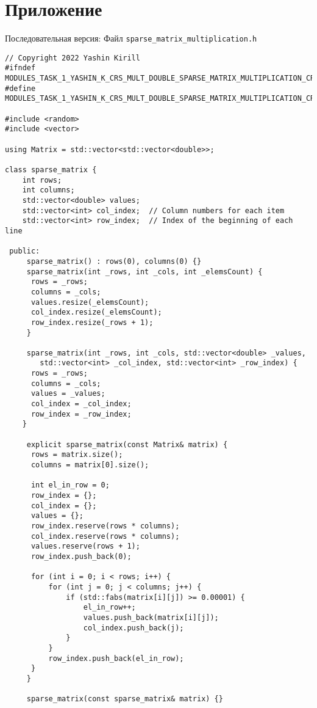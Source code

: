 \documentclass{report}
\begin{document}
\section*{Приложение}
Последовательная версия:
\newline
Файл \verb|sparse_matrix_multiplication.h|
\begin{lstlisting}
// Copyright 2022 Yashin Kirill
#ifndef MODULES_TASK_1_YASHIN_K_CRS_MULT_DOUBLE_SPARSE_MATRIX_MULTIPLICATION_CRS_H_
#define MODULES_TASK_1_YASHIN_K_CRS_MULT_DOUBLE_SPARSE_MATRIX_MULTIPLICATION_CRS_H_

#include <random>
#include <vector>

using Matrix = std::vector<std::vector<double>>;

class sparse_matrix {
    int rows;
    int columns;
    std::vector<double> values;
    std::vector<int> col_index;  // Column numbers for each item
    std::vector<int> row_index;  // Index of the beginning of each line

 public:
     sparse_matrix() : rows(0), columns(0) {}
     sparse_matrix(int _rows, int _cols, int _elemsCount) {
      rows = _rows;
      columns = _cols;
      values.resize(_elemsCount);
      col_index.resize(_elemsCount);
      row_index.resize(_rows + 1);
     }

     sparse_matrix(int _rows, int _cols, std::vector<double> _values,
        std::vector<int> _col_index, std::vector<int> _row_index) {
      rows = _rows;
      columns = _cols;
      values = _values;
      col_index = _col_index;
      row_index = _row_index;
    }

     explicit sparse_matrix(const Matrix& matrix) {
      rows = matrix.size();
      columns = matrix[0].size();

      int el_in_row = 0;
      row_index = {};
      col_index = {};
      values = {};
      row_index.reserve(rows * columns);
      col_index.reserve(rows * columns);
      values.reserve(rows + 1);
      row_index.push_back(0);

      for (int i = 0; i < rows; i++) {
          for (int j = 0; j < columns; j++) {
              if (std::fabs(matrix[i][j]) >= 0.00001) {
                  el_in_row++;
                  values.push_back(matrix[i][j]);
                  col_index.push_back(j);
              }
          }
          row_index.push_back(el_in_row);
      }
     }

     sparse_matrix(const sparse_matrix& matrix) {}


\end{lstlisting}
\end{document}
